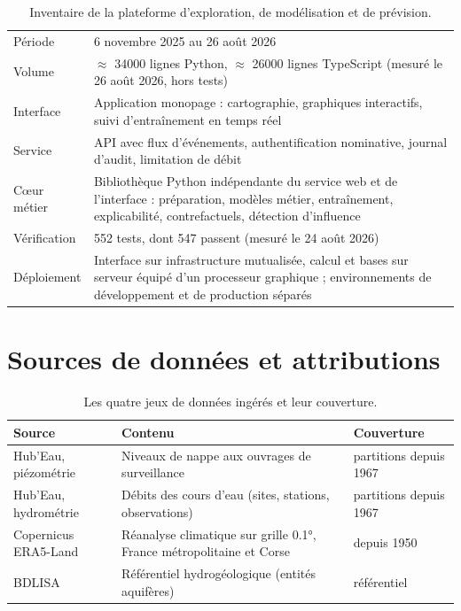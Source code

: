 \begin{table}[H]
\centering
\caption{Inventaire de la plateforme d'exploration, de modélisation et de prévision.}
\label{tab:inv-plateforme}
\begin{tabularx}{\textwidth}{@{}lX@{}}
\toprule
Période & 6 novembre 2025 au 26 août 2026 \\
Volume & $\approx$ \num{34000} lignes Python, $\approx$ \num{26000} lignes TypeScript (mesuré le 26 août 2026, hors tests) \\
Interface & Application monopage : cartographie, graphiques interactifs, suivi d'entraînement
en temps réel \\
Service & API avec flux d'événements, authentification nominative, journal d'audit, limitation
de débit \\
Cœur métier & Bibliothèque Python indépendante du service web et de l'interface : préparation, modèles métier,
entraînement, explicabilité, contrefactuels, détection d'influence \\
Vérification & \num{552} tests, dont \num{547} passent (mesuré le 24 août 2026) \\
Déploiement & Interface sur infrastructure mutualisée, calcul et bases sur serveur équipé d'un
processeur graphique ; environnements de développement et de production séparés \\
\bottomrule
\end{tabularx}
\end{table}

\section{Sources de données et attributions}

\begin{table}[H]
\centering
\caption{Les quatre jeux de données ingérés et leur couverture.}
\label{tab:sources}
\begin{tabularx}{\textwidth}{@{}lXl@{}}
\toprule
\textbf{Source} & \textbf{Contenu} & \textbf{Couverture} \\
\midrule
Hub'Eau, piézométrie & Niveaux de nappe aux ouvrages de surveillance & partitions depuis 1967 \\
Hub'Eau, hydrométrie & Débits des cours d'eau (sites, stations, observations) & partitions
depuis 1967 \\
Copernicus ERA5-Land & Réanalyse climatique sur grille \ang{0.1}, France métropolitaine et
Corse & depuis 1950 \\
BDLISA & Référentiel hydrogéologique (entités aquifères) & référentiel \\
\bottomrule
\end{tabularx}
\end{table}

